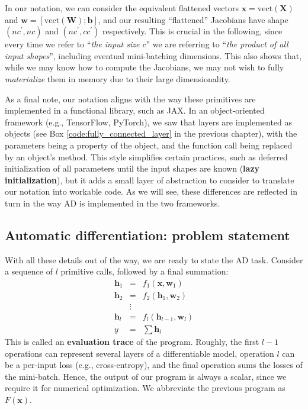 In our notation, we can consider the equivalent flattened vectors $\mathbf{x} = \text{vect}(\mathbf{X})$ and $\mathbf{w} = \left[\text{vect}(\mathbf{W}); \mathbf{b}\right]$, and our resulting “flattened” Jacobians have shape $(nc^\prime, nc)$ and $(nc^\prime, cc^\prime)$ respectively. This is crucial in the following, since every time we refer to “\textit{the input size $c$}” we are referring to “\textit{the product of all input shapes}”, including eventual mini-batching dimensions. This also shows that, while we may know how to compute the Jacobians, we may not wish to fully \textit{materialize} them in memory due to their large dimensionality.

As a final note, our notation aligns with the way these primitives are implemented in a functional library, such as JAX. In an object-oriented framework (e.g., TensorFlow, PyTorch), we saw
that layers are implemented as objects (see Box \ref{code:fully_connected_layer} in the previous chapter), with the parameters being a property of the object, and the function call being replaced by an object’s method. This style simplifies certain practices, such as deferred initialization of all parameters until the input shapes are known (\textbf{lazy initialization}), but it adds a small layer of abstraction to consider to translate our notation into workable code. As we will see, these differences are reflected in turn in the way AD is implemented in the two frameworks.

\subsection{Automatic differentiation: problem statement}

With all these details out of the way, we are ready to state the AD task. Consider a sequence of $l$ primitive calls, followed by a final summation:
%
\begin{eqnarray*}
\mathbf{h}_1 & = & f_1(\mathbf{x}, \mathbf{w}_1) 
\\ \mathbf{h}_2 & = & f_2(\mathbf{h}_1, \mathbf{w}_2) \\ 
& \vdots &  \\ 
\mathbf{h}_{l} & = & f_{l}(\mathbf{h}_{l-1}, \mathbf{w}_{l}) 
\\ y & = & \sum \mathbf{h}_{l} 
\end{eqnarray*}
%
This is called an \textbf{evaluation trace} of the program. Roughly, the first $l-1$ operations can represent several layers of a differentiable model, operation $l$ can be a per-input loss (e.g., cross-entropy), and the final operation sums the losses of the mini-batch. Hence, the output of our program is always a scalar, since we require it for numerical optimization. We abbreviate the previous program as $F(\mathbf{x})$. 

